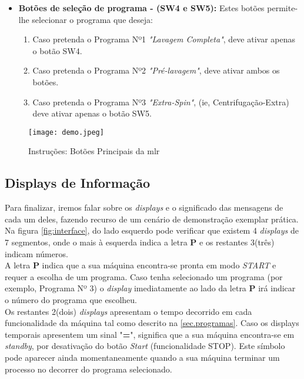 	\begin{itemize}
	\item\textbf{Botões de seleção de programa - (SW4 e SW5):} Estes botões permite-lhe selecionar o programa que deseja: 
	\begin{enumerate}
		\item Caso pretenda o Programa Nº1 \textit{"Lavagem Completa"}, deve ativar apenas o botão SW4. 
		\item Caso pretenda o Programa Nº2 \textit{"Pré-lavagem"}, deve ativar ambos os botões.
		\item Caso pretenda o Programa Nº3 \textit{"Extra-Spin"}, (ie, Centrifugação-Extra) deve ativar apenas o botão SW5. 
	\end{enumerate}	
	\end{itemize}		
		
\begin{figure}[H]
	\centering
	\texttt{[image: demo.jpeg]}
	\caption{Instruções: Botões Principais da \acf{mlr}}
	\label{fig:interface}
\end{figure}

\subsection{Displays de Informação}
\label{sec.display}

Para finalizar, iremos falar sobre os \textit{displays} e o significado das mensagens de cada um deles, fazendo recurso de um cenário de demonstração exemplar prática. Na figura \autoref{fig:interface}, do lado esquerdo pode verificar que existem 4 \textit{displays} de 7 segmentos, onde o mais à esquerda indica a letra \textbf{P} e os restantes 3(três) indicam números. \\ 
A letra \textbf{P} indica que a sua máquina encontra-se pronta em modo \textit{START} e requer a escolha de um programa. Caso tenha selecionado um programa (por exemplo, Programa Nº 3) o \textit{display} imediatamente ao lado da letra \textbf{P} irá indicar o número do programa que escolheu. \\
Os restantes 2(dois) \textit{displays} apresentam o tempo decorrido em cada funcionalidade da máquina tal como descrito na \autoref{sec.programas}. Caso os displays temporais apresentem um sinal "\textbf{=}", significa que a sua máquina encontra-se em \textit{standby}, por desativação do botão \textit{Start} (funcionalidade STOP). Este símbolo pode aparecer ainda momentaneamente quando a sua máquina terminar um processo no decorrer do programa selecionado.\\

